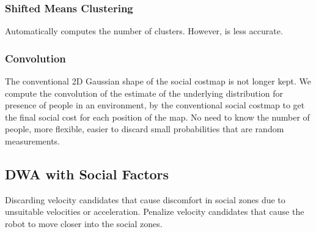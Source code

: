 \subsubsection*{Shifted Means Clustering}
Automatically computes the number of clusters. However, is less accurate. 

\subsubsection{Convolution}
The conventional 2D Gaussian shape of the social costmap is not longer kept. We compute the convolution of the estimate of the underlying distribution for presence of people in an environment, by the conventional social costmap to get the final social cost for each position of the map.
No need to know the number of people, more flexible, easier to discard small probabilities that are random measurements.


\subsection{DWA with Social Factors}
Discarding velocity candidates that cause discomfort in social zones due to unsuitable velocities or acceleration.
Penalize velocity candidates that cause the robot to move closer into the social zones.
